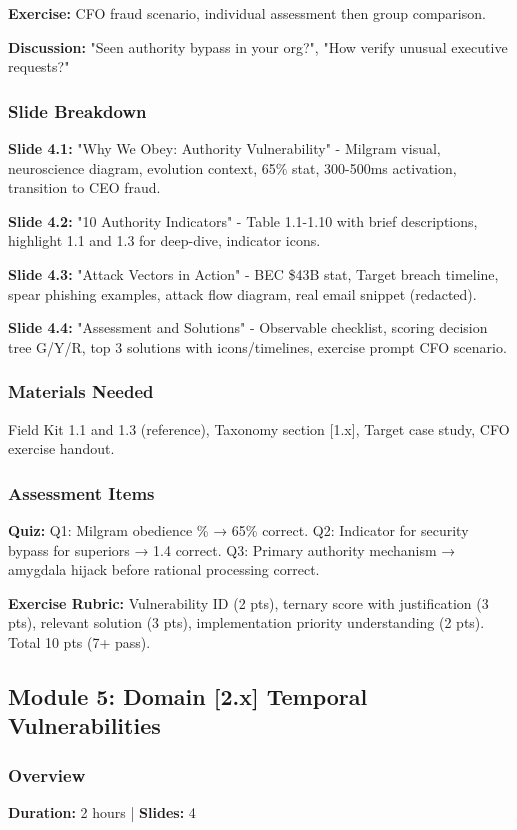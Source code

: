 \documentclass[11pt,a4paper]{article}
\begin{document}
\textbf{Exercise:} CFO fraud scenario, individual assessment then group comparison.

\textbf{Discussion:} "Seen authority bypass in your org?", "How verify unusual executive requests?"

\subsubsection{Slide Breakdown}
\textbf{Slide 4.1:} "Why We Obey: Authority Vulnerability" - Milgram visual, neuroscience diagram, evolution context, 65\% stat, 300-500ms activation, transition to CEO fraud.

\textbf{Slide 4.2:} "10 Authority Indicators" - Table 1.1-1.10 with brief descriptions, highlight 1.1 and 1.3 for deep-dive, indicator icons.

\textbf{Slide 4.3:} "Attack Vectors in Action" - BEC \$43B stat, Target breach timeline, spear phishing examples, attack flow diagram, real email snippet (redacted).

\textbf{Slide 4.4:} "Assessment and Solutions" - Observable checklist, scoring decision tree G/Y/R, top 3 solutions with icons/timelines, exercise prompt CFO scenario.

\subsubsection{Materials Needed}
Field Kit 1.1 and 1.3 (reference), Taxonomy section [1.x], Target case study, CFO exercise handout.

\subsubsection{Assessment Items}
\textbf{Quiz:} Q1: Milgram obedience \% → 65\% correct. Q2: Indicator for security bypass for superiors → 1.4 correct. Q3: Primary authority mechanism → amygdala hijack before rational processing correct.

\textbf{Exercise Rubric:} Vulnerability ID (2 pts), ternary score with justification (3 pts), relevant solution (3 pts), implementation priority understanding (2 pts). Total 10 pts (7+ pass).

\subsection{Module 5: Domain [2.x] Temporal Vulnerabilities}

\subsubsection{Overview}
\textbf{Duration:} 2 hours | \textbf{Slides:} 4
\end{document}

